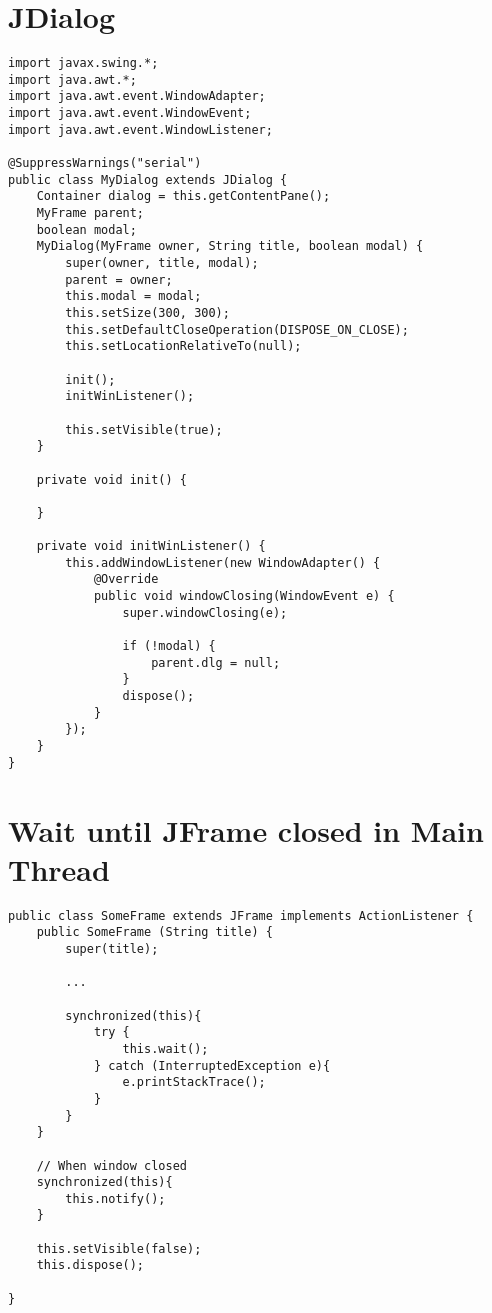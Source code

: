 \section{JDialog}
\begin{verbatim}
import javax.swing.*;
import java.awt.*;
import java.awt.event.WindowAdapter;
import java.awt.event.WindowEvent;
import java.awt.event.WindowListener;

@SuppressWarnings("serial")
public class MyDialog extends JDialog {
    Container dialog = this.getContentPane();
    MyFrame parent;
    boolean modal;
    MyDialog(MyFrame owner, String title, boolean modal) {
        super(owner, title, modal);
        parent = owner;
        this.modal = modal;
        this.setSize(300, 300);
        this.setDefaultCloseOperation(DISPOSE_ON_CLOSE);
        this.setLocationRelativeTo(null);

        init();
        initWinListener();

        this.setVisible(true);
    }

    private void init() {
        
    }

    private void initWinListener() {
        this.addWindowListener(new WindowAdapter() {
            @Override
            public void windowClosing(WindowEvent e) {
                super.windowClosing(e);

                if (!modal) {
                    parent.dlg = null;
                }
                dispose();
            }
        });
    }
}

\end{verbatim}

\section{Wait until JFrame closed in Main Thread}
\begin{verbatim}
public class SomeFrame extends JFrame implements ActionListener {
    public SomeFrame (String title) {
        super(title);

        ...
        
        synchronized(this){
            try {
                this.wait();
            } catch (InterruptedException e){
                e.printStackTrace();
            }
        }
    }

    // When window closed
    synchronized(this){
        this.notify();
    }

    this.setVisible(false);
    this.dispose();

}
\end{verbatim}


